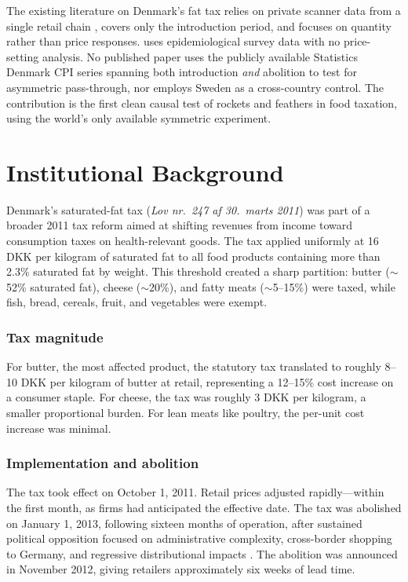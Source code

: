 \documentclass[12pt]{article}
\begin{document}
The existing literature on Denmark's fat tax relies on private scanner data from a single retail chain \citep{smed2016, jensen2013}, covers only the introduction period, and focuses on quantity rather than price responses. \citet{bodker2015} uses epidemiological survey data with no price-setting analysis. No published paper uses the publicly available Statistics Denmark CPI series spanning both introduction \textit{and} abolition to test for asymmetric pass-through, nor employs Sweden as a cross-country control. The contribution is the first clean causal test of rockets and feathers in food taxation, using the world's only available symmetric experiment.

\section{Institutional Background}

Denmark's saturated-fat tax (\textit{Lov nr.\ 247 af 30.\ marts 2011}) was part of a broader 2011 tax reform aimed at shifting revenues from income toward consumption taxes on health-relevant goods. The tax applied uniformly at 16 DKK per kilogram of saturated fat to all food products containing more than 2.3\% saturated fat by weight. This threshold created a sharp partition: butter ($\sim$52\% saturated fat), cheese ($\sim$20\%), and fatty meats ($\sim$5--15\%) were taxed, while fish, bread, cereals, fruit, and vegetables were exempt.

\subsubsection*{Tax magnitude} For butter, the most affected product, the statutory tax translated to roughly 8--10 DKK per kilogram of butter at retail, representing a 12--15\% cost increase on a consumer staple. For cheese, the tax was roughly 3 DKK per kilogram, a smaller proportional burden. For lean meats like poultry, the per-unit cost increase was minimal.

\subsubsection*{Implementation and abolition} The tax took effect on October 1, 2011. Retail prices adjusted rapidly---within the first month, as firms had anticipated the effective date. The tax was abolished on January 1, 2013, following sixteen months of operation, after sustained political opposition focused on administrative complexity, cross-border shopping to Germany, and regressive distributional impacts \citep{vallgaarda2015}. The abolition was announced in November 2012, giving retailers approximately six weeks of lead time.
\end{document}
